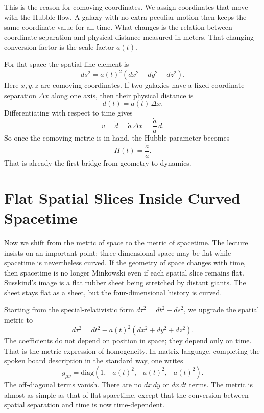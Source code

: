 This is the reason for comoving coordinates. We assign coordinates that move with the Hubble flow. A galaxy with no extra peculiar motion then keeps the same coordinate value for all time. What changes is the relation between coordinate separation and physical distance measured in meters. That changing conversion factor is the scale factor \(a(t)\).

For flat space the spatial line element is
\begin{equation}
ds^2 = a(t)^2\left(dx^2+dy^2+dz^2\right).
\end{equation}
Here \(x,y,z\) are comoving coordinates. If two galaxies have a fixed coordinate separation \(\Delta x\) along one axis, then their physical distance is
\begin{equation}
d(t)=a(t)\,\Delta x.
\end{equation}
Differentiating with respect to time gives
\begin{equation}
v=\dot d=\dot a\,\Delta x=\frac{\dot a}{a}\,d.
\end{equation}
So once the comoving metric is in hand, the Hubble parameter becomes
\begin{equation}
H(t)=\frac{\dot a}{a}.
\end{equation}
That is already the first bridge from geometry to dynamics.

\section{Flat Spatial Slices Inside Curved Spacetime}

Now we shift from the metric of space to the metric of spacetime. The lecture insists on an important point: three-dimensional space may be flat while spacetime is nevertheless curved. If the geometry of space changes with time, then spacetime is no longer Minkowski even if each spatial slice remains flat. Susskind's image is a flat rubber sheet being stretched by distant giants. The sheet stays flat as a sheet, but the four-dimensional history is curved.

Starting from the special-relativistic form \(d\tau^2=dt^2-ds^2\), we upgrade the spatial metric to
\begin{equation}
d\tau^2 = dt^2 - a(t)^2\left(dx^2+dy^2+dz^2\right).
\end{equation}
The coefficients do not depend on position in space; they depend only on time. That is the metric expression of homogeneity. In matrix language, completing the spoken board description in the standard way, one writes
\begin{equation}
g_{\mu\nu}=\mathrm{diag}\!\left(1,-a(t)^2,-a(t)^2,-a(t)^2\right).
\end{equation}
The off-diagonal terms vanish. There are no \(dx\,dy\) or \(dx\,dt\) terms. The metric is almost as simple as that of flat spacetime, except that the conversion between spatial separation and time is now time-dependent.

